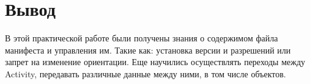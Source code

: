 \clearpage

\section*{\LARGE{Вывод}}
В этой практической работе были получены знания о содержимом файла
манифеста и управления им. Такие как: установка версии и разрешений или
запрет на изменение ориентации. Еще научились осуществлять переходы
между Activity, передавать различные данные между ними, в том числе
объектов.

